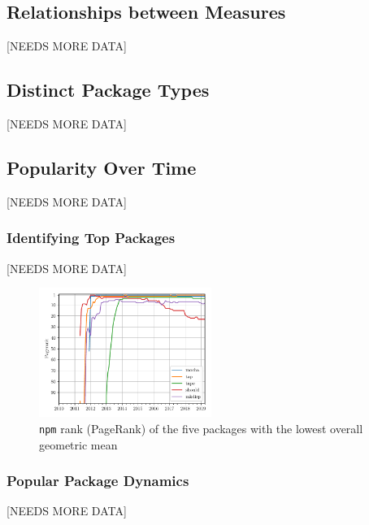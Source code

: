 \documentclass[10pt,conference]{IEEEtran}
\def\code#1{\texttt{#1}}
\begin{document}
\subsection{Relationships between Measures}
[NEEDS MORE DATA]

\subsection{Distinct Package Types}
[NEEDS MORE DATA]

\subsection{Popularity Over Time}
[NEEDS MORE DATA]

\subsubsection{Identifying Top Packages}
[NEEDS MORE DATA]

\begin{figure}
  \includegraphics[width=0.5\textwidth]{figures/geo_mean_highest_pagerank.pdf}
  \caption{\code{npm} rank (PageRank) of the five packages with the lowest overall geometric mean}
  \label{topFive}
\end{figure}


\subsubsection{Popular Package Dynamics}
[NEEDS MORE DATA]
\end{document}
